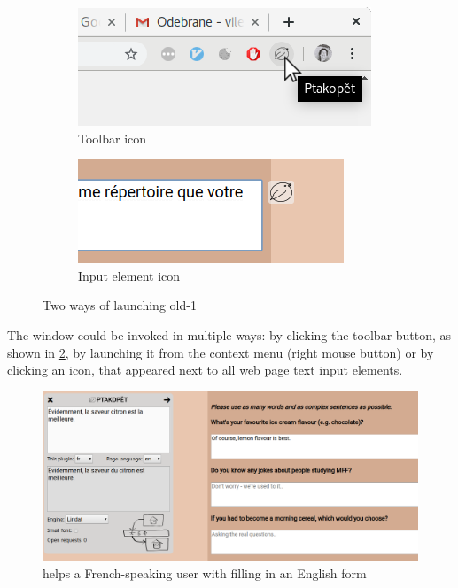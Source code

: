 \begin{figure}[ht]
\centering
\begin{subfigure}{.5\textwidth}
  \centering
  \includegraphics[width=.95\linewidth]{img/ptakopet_old-1/invoke_2}
  \caption{Toolbar icon}
  \label{fig:ptakopet_old-1/invoke_2}
\end{subfigure}%
\begin{subfigure}{.5\textwidth}
  \centering
  \includegraphics[width=.95\linewidth]{img/ptakopet_old-1/invoke_1}
  \caption{Input element icon}
  \label{fig:ptakopet_old-1/invoke_1}
\end{subfigure}
\caption{Two ways of launching \ptakopet{} old-1}
\label{}
\end{figure}

The \ptakopet{} window could be invoked in multiple ways: by clicking the toolbar button, as shown in \cref{fig:ptakopet_old-1/invoke_1}, by launching it from the context menu (right mouse button) or by clicking an icon, that appeared next to all web page text input elements.

\begin{figure}[ht]
    \centering
    \includegraphics[width=1\textwidth]{img/ptakopet_old-1/ice_cream}
    \caption{\ptakopet{} helps a French-speaking user with filling in an English form}
    \label{fig:ptakopet_old-1/ice_cream}
\end{figure}

